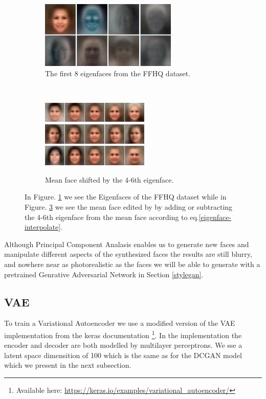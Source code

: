 \begin{figure} [h!]
\centering
    \begin{subfigure}[b]{0.55\textwidth}
    \includegraphics[height=3.2cm]{fig/PCA/pca}
     \caption{The first 8 eigenfaces from the FFHQ dataset.}
    \label{eigenfacehere}
    \end{subfigure}
    ~
    \begin{subfigure}[b]{0.4\textwidth}
        \includegraphics[height=1cm]{fig/PCA/pca3}
        \includegraphics[height=1cm]{fig/PCA/pca4}
         \includegraphics[height=1cm]{fig/PCA/pca5}
         \caption{Mean face shifted by the 4-6th eigenface.}
         \label{components}
    \end{subfigure}
     \caption{ In Figure. \ref{eigenfacehere} we see the Eigenfaces of the FFHQ dataset while in Figure. \ref{components} we see the mean face edited by by adding or subtracting the 4-6th eigenface from the mean face according to eq.\ref{eigenface-interpolate}.}
\end{figure}
Although Principal Component Analasis enables us to generate new faces and manipulate different aspects of the synthesized faces the results are still blurry, and nowhere near as photorealistic as the faces we will be able to generate with a pretrained Genrative Adversarial Network in Section \ref{stylegan}.

\subsection{VAE}
To train a Variational Autoencoder we use a modified version of the VAE implementation from the keras documentation \footnote{ Available here: \url{https://keras.io/examples/variational_autoencoder/}}. In the implementation the encoder and decoder are both modelled by multilayer perceptrons. We sse a latent space dimensition of 100 which is the same as for the DCGAN model which we present in the next subsection.   

